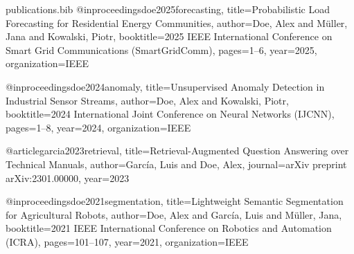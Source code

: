 \begin{filecontents*}{publications.bib}
@inproceedings{doe2025forecasting,
  title={Probabilistic Load Forecasting for Residential Energy Communities},
  author={Doe, Alex and M{\"u}ller, Jana and Kowalski, Piotr},
  booktitle={2025 IEEE International Conference on Smart Grid Communications (SmartGridComm)},
  pages={1--6},
  year={2025},
  organization={IEEE}
}

@inproceedings{doe2024anomaly,
  title={Unsupervised Anomaly Detection in Industrial Sensor Streams},
  author={Doe, Alex and Kowalski, Piotr},
  booktitle={2024 International Joint Conference on Neural Networks (IJCNN)},
  pages={1--8},
  year={2024},
  organization={IEEE}
}

@article{garcia2023retrieval,
  title={Retrieval-Augmented Question Answering over Technical Manuals},
  author={Garc{\'i}a, Luis and Doe, Alex},
  journal={arXiv preprint arXiv:2301.00000},
  year={2023}
}

@inproceedings{doe2021segmentation,
  title={Lightweight Semantic Segmentation for Agricultural Robots},
  author={Doe, Alex and Garc{\'i}a, Luis and M{\"u}ller, Jana},
  booktitle={2021 IEEE International Conference on Robotics and Automation (ICRA)},
  pages={101--107},
  year={2021},
  organization={IEEE}
}
\end{filecontents*}

\documentclass[a4paper,10pt]{article}
\usepackage[utf8]{inputenc}
\usepackage[T1]{fontenc}
\usepackage{lmodern}
\usepackage[margin=1in]{geometry}
\usepackage{enumitem}
\usepackage{hyperref}



\begin{center}
    {\LARGE \textbf{Alex Doe}}\\[2mm]
    \href{mailto:alex.doe@example.com}{alex.doe@example.com} \quad | \quad +00 0 00000000 \quad | \quad Example City, Country
\\[1mm]
\href{https://www.linkedin.com/in/example}{LinkedIn}
\quad
\href{https://github.com/example}{Github}\\
\textbf{Work authorization}: Example statement about your right to work, if relevant
\end{center}
\vspace{0.5\baselineskip}\hrule\vspace{0.5\baselineskip}

